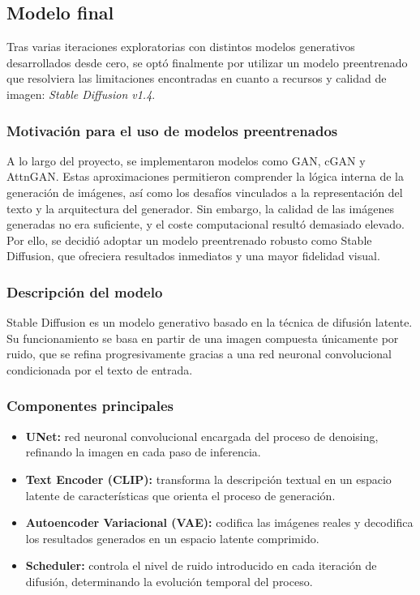\subsection{Modelo final}
Tras varias iteraciones exploratorias con distintos modelos generativos desarrollados desde cero, se optó finalmente por utilizar un modelo preentrenado que resolviera las limitaciones encontradas en cuanto a recursos y calidad de imagen: \textit{Stable Diffusion v1.4}.

\subsubsection{Motivación para el uso de modelos preentrenados}
A lo largo del proyecto, se implementaron modelos como GAN, cGAN y AttnGAN. Estas aproximaciones permitieron comprender la lógica interna de la generación de imágenes, así como los desafíos vinculados a la representación del texto y la arquitectura del generador. Sin embargo, la calidad de las imágenes generadas no era suficiente, y el coste computacional resultó demasiado elevado. Por ello, se decidió adoptar un modelo preentrenado robusto como Stable Diffusion, que ofreciera resultados inmediatos y una mayor fidelidad visual.

\subsubsection{Descripción del modelo}
Stable Diffusion es un modelo generativo basado en la técnica de difusión latente. Su funcionamiento se basa en partir de una imagen compuesta únicamente por ruido, que se refina progresivamente gracias a una red neuronal convolucional condicionada por el texto de entrada.

\subsubsection{Componentes principales}
\begin{itemize}
    \item \textbf{UNet:} red neuronal convolucional encargada del proceso de denoising, refinando la imagen en cada paso de inferencia.
    \item \textbf{Text Encoder (CLIP):} transforma la descripción textual en un espacio latente de características que orienta el proceso de generación.
    \item \textbf{Autoencoder Variacional (VAE):} codifica las imágenes reales y decodifica los resultados generados en un espacio latente comprimido.
    \item \textbf{Scheduler:} controla el nivel de ruido introducido en cada iteración de difusión, determinando la evolución temporal del proceso.
\end{itemize}

